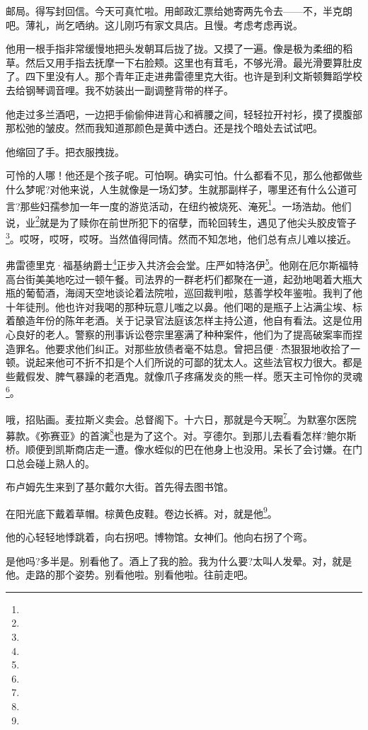 \par 邮局。得写封回信。今天可真忙啦。用邮政汇票给她寄两先令去——不，半克朗吧。薄礼，尚乞哂纳。这儿刚巧有家文具店。且慢。考虑考虑再说。
\par 他用一根手指非常缓慢地把头发朝耳后拢了拢。又摸了一遍。像是极为柔细的稻草。然后又用手指去抚摩一下右脸颊。这里也有茸毛，不够光滑。最光滑要算肚皮了。四下里没有人。那个青年正走进弗雷德里克大街。也许是到利文斯顿舞蹈学校去给钢琴调音哩。我不妨装出一副调整背带的样子。
\par 他走过多兰酒吧，一边把手偷偷伸进背心和裤腰之间，轻轻拉开衬衫，摸了摸腹部那松弛的皱皮。然而我知道那颜色是黄中透白。还是找个暗处去试试吧。
\par 他缩回了手。把衣服拽拢。
\par 可怜的人哪！他还是个孩子呢。可怕啊。确实可怕。什么都看不见，那么他都做些什么梦呢?对他来说，人生就像是一场幻梦。生就那副样子，哪里还有什么公道可言?那些妇孺参加一年一度的游览活动，在纽约被烧死、淹死\footnote{}。一场浩劫。他们说，业\footnote{}就是为了赎你在前世所犯下的宿孽，而轮回转生，遇见了他尖头胶皮管子\footnote{}。哎呀，哎呀，哎呀。当然值得同情。然而不知怎地，他们总有点儿难以接近。
\par 弗雷德里克·福基纳爵士\footnote{}正步入共济会会堂。庄严如特洛伊\footnote{}。他刚在厄尔斯福特高台街美美地吃过一顿午餐。司法界的一群老朽们都聚在一道，起劲地喝着大瓶大瓶的葡萄酒，海阔天空地谈论着法院啦，巡回裁判啦，慈善学校年鉴啦。我判了他十年徒刑。他也许对我喝的那种玩意儿嗤之以鼻。他们喝的是瓶子上沾满尘埃、标着酿造年份的陈年老酒。关于记录官法庭该怎样主持公道，他自有看法。这是位用心良好的老人。警察的刑事诉讼卷宗里塞满了种种案件，他们为了提高破案率而捏造罪名。他要求他们纠正。对那些放债者毫不姑息。曾把吕便·杰狠狠地收拾了一顿。说起来他可不折不扣是个人们所说的可鄙的犹太人。这些法官权力很大。都是些戴假发、脾气暴躁的老酒鬼。就像爪子疼痛发炎的熊一样。愿天主可怜你的灵魂\footnote{}。
\par 哦，招贴画。麦拉斯义卖会。总督阁下。十六日，那就是今天啊\footnote{}。为默塞尔医院募款。《弥赛亚》的首演\footnote{}也是为了这个。对。亨德尔。到那儿去看看怎样?鲍尔斯桥。顺便到凯斯商店走一遭。像水蛭似的巴在他身上也没用。呆长了会讨嫌。在门口总会碰上熟人的。
\par 布卢姆先生来到了基尔戴尔大街。首先得去图书馆。
\par 在阳光底下戴着草帽。棕黄色皮鞋。卷边长裤。对，就是他\footnote{}。
\par 他的心轻轻地悸跳着，向右拐吧。博物馆。女神们。他向右拐了个弯。
\par 是他吗?多半是。别看他了。酒上了我的脸。我为什么要?太叫人发晕。对，就是他。走路的那个姿势。别看他啦。别看他啦。往前走吧。

